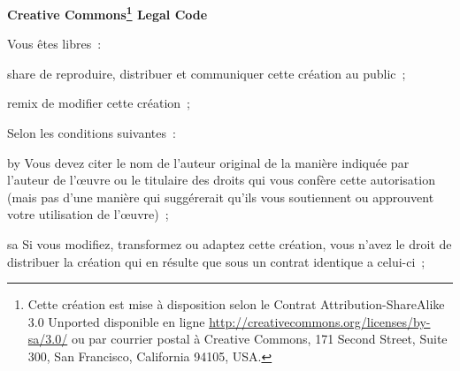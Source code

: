\begin{center} 
  \textbf{\LARGE{Creative Commons\footnote{ Cette création est mise à
        disposition selon le Contrat Attribution-ShareAlike 3.0
        Unported disponible en ligne
        \url{http://creativecommons.org/licenses/by-sa/3.0/} ou par
        courrier postal à Creative Commons, 171 Second Street, Suite
        300, San Francisco, California 94105, USA.} Legal Code} }
\end{center}
\vspace{1cm}

\begin{lblock}{Vous êtes libres~:}

  \begin{pictonote}{share}
    de reproduire, distribuer et communiquer cette création au
    public~;
  \end{pictonote}

  \begin{pictonote}{remix}
    de modifier cette création~;
  \end{pictonote}

\end{lblock}
\begin{lblock}{Selon les conditions suivantes~:}
  
  \begin{pictonote}{by}
     Vous devez citer le nom de l'auteur
    original de la manière indiquée par l'auteur de l'œuvre ou le
    titulaire des droits qui vous confère cette autorisation (mais pas
    d'une manière qui suggérerait qu'ils vous soutiennent ou
    approuvent votre utilisation de l'œuvre)~;
  \end{pictonote}
  
  \begin{pictonote}{sa}
     Si
    vous modifiez, transformez ou adaptez cette création, vous n'avez
    le droit de distribuer la création qui en résulte que sous un
    contrat identique a celui-ci~;
  \end{pictonote}
  
\end{lblock}
